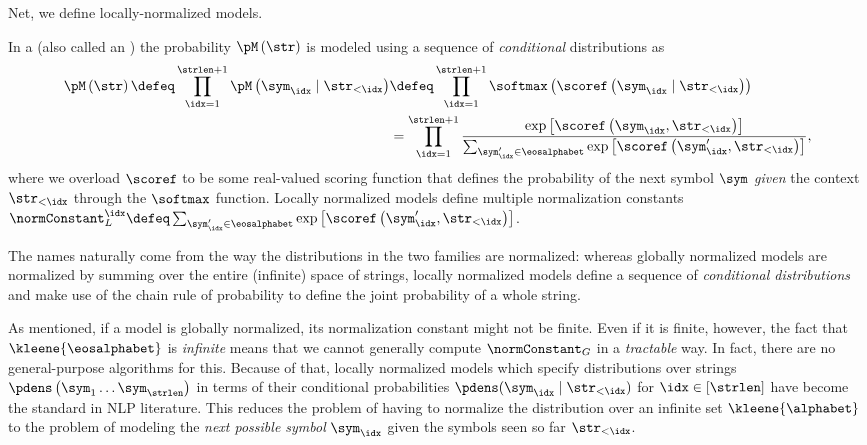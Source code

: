 Net, we define locally-normalized models.
\begin{definition} \label{def:locally-normalized-model}
    In a  (also called an ) the probability $\pM\left(\str\right)$ is modeled using a sequence of \emph{conditional} distributions as
    \begin{align} \label{eq:locally-normalized-model}
        \pM\left(\str\right) \nonumber
        \defeq \prod_{\idx = 1}^{\strlen + 1}\pM\left(\sym_\idx\mid\str_{<\idx}\right) 
        &\defeq \prod_{\idx = 1}^{\strlen + 1} \softmax\left(\scoref\left(\sym_\idx \mid \str_{<\idx}\right)\right) \\ 
        &= \prod_{\idx = 1}^{\strlen + 1}\frac{\exp{\left[\scoref\left(\sym_\idx, \str_{<\idx}\right)\right]}}{\sum_{\sym_\idx' \in \eosalphabet}\exp{\left[\scoref\left(\sym_\idx', \str_{<\idx}\right)\right]}},
    \end{align}
    where we overload $\scoref$ to be some real-valued scoring function that defines the probability of the next symbol $\sym$ \emph{given} the context $\str_{<\idx}$ through the $\softmax$ function.
    Locally normalized models define multiple normalization constants $\normConstant_L^\idx \defeq \sum_{\sym_\idx' \in \eosalphabet}\exp{\left[\scoref\left(\sym_\idx', \str_{<\idx}\right)\right]}$.
\end{definition}

The names naturally come from the way the distributions in the two families are normalized: whereas globally normalized models are normalized by summing over the entire (infinite) space of strings, locally normalized models define a sequence of \emph{conditional distributions} and make use of the chain rule of probability to define the joint probability of a whole string.


As mentioned, if a model is globally normalized, its normalization constant might not be finite.
Even if it is finite, however, the fact that $\kleene{\eosalphabet}$ is \emph{infinite} means that we cannot generally compute $\normConstant_G$ in a \emph{tractable} way.
In fact, there are no general-purpose algorithms for this.
Because of that, locally normalized models which specify distributions over strings $\pdens\left(\sym_1 \ldots \sym_\strlen\right)$ in terms of their conditional probabilities $\pdens(\sym_\idx \mid \str_{<\idx})$ for $\idx \in \left[\strlen\right]$ have become the standard in NLP literature.
This reduces the problem of having to normalize the distribution over an infinite set $\kleene{\alphabet}$ to the problem of modeling the \emph{next possible symbol} $\sym_\idx$ given the symbols seen so far $\str_{<\idx}$.

